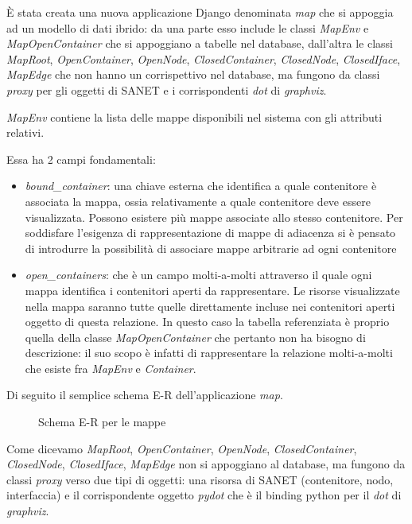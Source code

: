 \documentclass[a4wide,10pt,italian]{manual}
\begin{document}
È stata creata una nuova applicazione Django denominata \emph{map} che si appoggia ad
un modello di dati ibrido: da una parte esso include le classi \emph{MapEnv} e \emph{MapOpenContainer}
che si appoggiano a tabelle nel database, dall'altra le
classi \emph{MapRoot}, \emph{OpenContainer}, \emph{OpenNode}, \emph{ClosedContainer}, \emph{ClosedNode}, \emph{ClosedIface}, \emph{MapEdge} che non
hanno un corrispettivo nel database, ma fungono da classi \emph{proxy} per gli oggetti di SANET e i corrispondenti \emph{dot} di \emph{graphviz}.

\emph{MapEnv} contiene la lista delle mappe disponibili nel sistema con gli attributi relativi.

Essa ha 2 campi fondamentali:
\begin{itemize}
\item {} 
\emph{bound\_container}: una chiave esterna che identifica a quale contenitore è associata la mappa,
ossia relativamente a quale contenitore deve essere visualizzata. Possono esistere più mappe associate
allo stesso contenitore. Per soddisfare l'esigenza di rappresentazione di mappe di adiacenza si è
pensato di introdurre la possibilità di associare mappe arbitrarie ad ogni contenitore

\item {} 
\emph{open\_containers}: che è un campo molti-a-molti attraverso il quale ogni mappa identifica i contenitori
aperti da rappresentare. Le risorse visualizzate nella mappa saranno tutte quelle direttamente incluse
nei contenitori aperti oggetto di questa relazione.
In questo caso la tabella referenziata è proprio quella della classe \emph{MapOpenContainer} che pertanto non ha bisogno di descrizione:
il suo scopo è infatti di rappresentare la relazione molti-a-molti che esiste fra \emph{MapEnv} e \emph{Container}.

\end{itemize}

Di seguito il semplice schema E-R dell'applicazione \emph{map}.
\begin{figure}[htbp]
\centering

\caption{Schema E-R per le mappe}\end{figure}

Come dicevamo
\emph{MapRoot}, \emph{OpenContainer}, \emph{OpenNode}, \emph{ClosedContainer}, \emph{ClosedNode}, \emph{ClosedIface}, \emph{MapEdge} non
si appoggiano al database, ma fungono da classi \emph{proxy} verso due tipi di oggetti: una risorsa di SANET (contenitore, nodo, interfaccia) e il corrispondente oggetto \emph{pydot} che è il binding python per il \emph{dot} di \emph{graphviz}.
\end{document}
